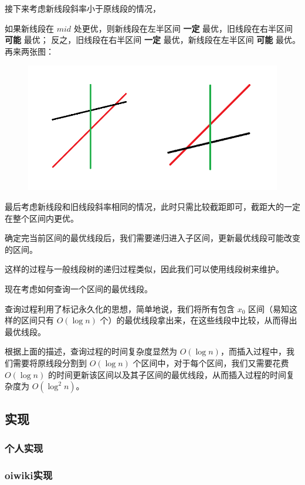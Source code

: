 	接下来考虑新线段斜率小于原线段的情况，

	如果新线段在 $mid$ 处更优，则新线段在左半区间 \textbf{一定} 最优，旧线段在右半区间 \textbf{可能} 最优；
	反之，旧线段在右半区间 \textbf{一定} 最优，新线段在左半区间 \textbf{可能} 最优。
	再来两张图：
	\begin{figure}[htbp]
		\centering
		\includegraphics[scale = 0.5]{./image/li-chao-tree2.png}
	\end{figure}
	
	最后考虑新线段和旧线段斜率相同的情况，此时只需比较截距即可，截距大的一定在整个区间内更优。
	
	确定完当前区间的最优线段后，我们需要递归进入子区间，更新最优线段可能改变的区间。
	
	这样的过程与一般线段树的递归过程类似，因此我们可以使用线段树来维护。
	
	现在考虑如何查询一个区间的最优线段。
	
	查询过程利用了标记永久化的思想，简单地说，我们将所有包含 $x_0$ 区间（易知这样的区间只有 $O(\log n)$ 个）的最优线段拿出来，在这些线段中比较，从而得出最优线段。
	
	根据上面的描述，查询过程的时间复杂度显然为 $O(\log n)$，而插入过程中，我们需要将原线段分割到 $O(\log n)$ 个区间中，对于每个区间，我们又需要花费 $O(\log n)$ 的时间更新该区间以及其子区间的最优线段，从而插入过程的时间复杂度为 $O(\log^2 n)$。
\subsection{实现}
\subsubsection{个人实现}
	
\subsubsection{oiwiki实现}
	
	